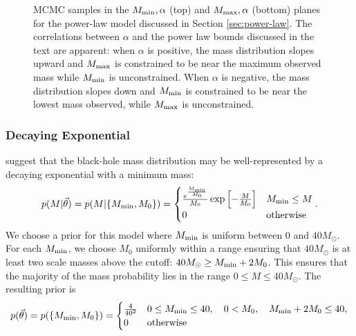 \documentclass[preprint]{aastex}
\newcommand{\Msun}{M_\odot}
\newcommand{\Mmin}{M_{\textnormal{min}}}
\newcommand{\Mmax}{M_{\textnormal{max}}}
\newcommand{\vtheta}{\vec{\theta}}
\begin{document}
\begin{figure}
  \begin{center}
  \end{center}
  \caption{\label{fig:power-law-2D} MCMC samples in the $\Mmin,
    \alpha$ (top) and $\Mmax, \alpha$ (bottom) planes for the
    power-law model discussed in Section \ref{sec:power-law}.  The
    correlations between $\alpha$ and the power law bounds discussed
    in the text are apparent: when $\alpha$ is positive, the mass
    distribution slopes upward and $\Mmax$ is constrained to be near
    the maximum observed mass while $\Mmin$ is unconstrained.  When
    $\alpha$ is negative, the mass distribution slopes down and
    $\Mmin$ is constrained to be near the lowest mass observed, while
    $\Mmax$ is unconstrained. }
\end{figure}

\subsubsection{Decaying Exponential}
\label{sec:exponential}

\citet{Fryer2001} suggest that the black-hole mass distribution may be
well-represented by a decaying exponential with a minimum mass:
\begin{equation}
  \label{eq:exp-def}
  p(M|\vtheta) = p(M|\{\Mmin, M_0\}) = 
  \begin{cases}
    \frac{e^{\frac{\Mmin}{M_0}}}{M_0} \exp \left[ - \frac{M}{M_0}
    \right] & \Mmin \leq M \\
    0 & \textnormal{otherwise}
  \end{cases}.
\end{equation}
We choose a prior for this model where $\Mmin$ is uniform between 0
and $40 \Msun$.  For each $\Mmin$, we choose $M_0$ uniformly within a
range ensuring that $40\Msun$ is at least two scale masses above the
cutoff: $40\Msun \geq \Mmin + 2 M_0$.  This ensures that the majority
of the mass probability lies in the range $0 \leq M \leq 40\Msun$.
The resulting prior is
\begin{equation}
  p(\vtheta) = p(\{\Mmin, M_0\}) = 
  \begin{cases}
    \frac{4}{40^2} & 0 \leq \Mmin \leq 40, \quad 0 < M_0, \quad \Mmin
    + 2 M_0 \leq 40, \\
    0 & \textnormal{otherwise}
  \end{cases}
\end{equation}
\end{document}
